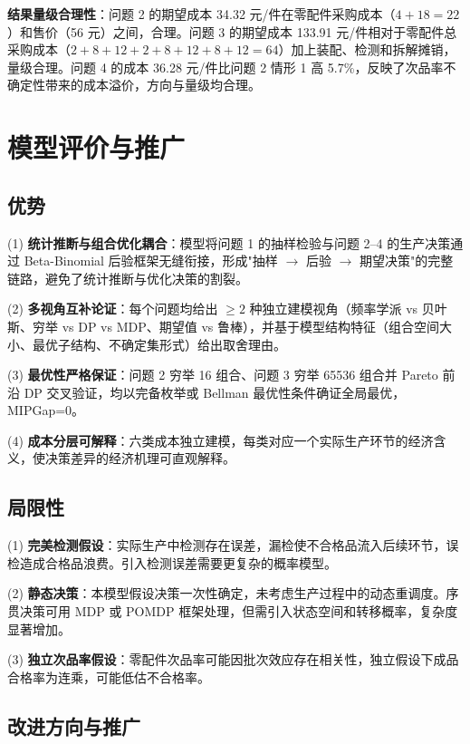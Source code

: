 \documentclass[12pt,a4paper]{ctexart}
\begin{document}
\textbf{结果量级合理性}：问题 2 的期望成本 34.32 元/件在零配件采购成本（$4+18=22$）和售价（56 元）之间，合理。问题 3 的期望成本 133.91 元/件相对于零配件总采购成本（$2+8+12+2+8+12+8+12=64$）加上装配、检测和拆解摊销，量级合理。问题 4 的成本 36.28 元/件比问题 2 情形 1 高 5.7\%，反映了次品率不确定性带来的成本溢价，方向与量级均合理。

\section{模型评价与推广}

\subsection{优势}

(1) \textbf{统计推断与组合优化耦合}：模型将问题 1 的抽样检验与问题 2--4 的生产决策通过 Beta-Binomial 后验框架无缝衔接，形成"抽样 $\to$ 后验 $\to$ 期望决策"的完整链路，避免了统计推断与优化决策的割裂。

(2) \textbf{多视角互补论证}：每个问题均给出 $\ge 2$ 种独立建模视角（频率学派 vs 贝叶斯、穷举 vs DP vs MDP、期望值 vs 鲁棒），并基于模型结构特征（组合空间大小、最优子结构、不确定集形式）给出取舍理由。

(3) \textbf{最优性严格保证}：问题 2 穷举 16 组合、问题 3 穷举 65536 组合并 Pareto 前沿 DP 交叉验证，均以完备枚举或 Bellman 最优性条件确证全局最优，MIPGap=0。

(4) \textbf{成本分层可解释}：六类成本独立建模，每类对应一个实际生产环节的经济含义，使决策差异的经济机理可直观解释。

\subsection{局限性}

(1) \textbf{完美检测假设}：实际生产中检测存在误差，漏检使不合格品流入后续环节，误检造成合格品浪费。引入检测误差需要更复杂的概率模型。

(2) \textbf{静态决策}：本模型假设决策一次性确定，未考虑生产过程中的动态重调度。序贯决策可用 MDP 或 POMDP 框架处理，但需引入状态空间和转移概率，复杂度显著增加。

(3) \textbf{独立次品率假设}：零配件次品率可能因批次效应存在相关性，独立假设下成品合格率为连乘，可能低估不合格率。

\subsection{改进方向与推广}
\end{document}
